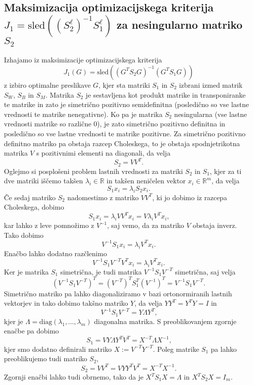 \documentclass[mat1]{article}
\theoremstyle{definition}
\begin{document}
\subsection{Maksimizacija optimizacijskega kriterija $J_1 = \text{sled} \left((S^\ell_2)^{-1} S^\ell_1 \right)$ za nesingularno matriko $S_2$}
Izhajamo iz maksimizacije optimizacijskega kriterija 
$$J_1(G) = \text{sled}\left((G^T S_2 G)^{-1} (G^T S_1 G)\right)$$
z izbiro optimalne preslikave $G$, kjer sta matriki $S_1$ in $S_2$ izbrani izmed matrik $S_W$, $S_B$ in $S_M$.
Matrika $S_2$ je sestavljena kot produkt matrike in transponiranke te matrike in zato je simetrično pozitivno semidefinitna (posledično so vse lastne vrednosti te matrike nenegativne). Ko pa je matrika $S_2$ nesingularna (vse lastne vrednosti matrike so različne $0$), je zato simetrično pozitivno definitna in posledično so vse lastne vrednosti te matrike pozitivne. Za simetrično pozitivno definitno matriko pa obstaja razcep Choleskega, to je obstaja spodnjetrikotna matrika $V$ s pozitivnimi elementi na diagonali, da velja
$$ S_2 = V V^T \text{.}
$$
Oglejmo si posplošeni problem lastnih vrednosti za matriki $S_2$ in $S_1$, kjer za ti dve matriki iščemo takšen $\lambda_i \in \mathbb{R}$ in takšen neničelen vektor $x_i \in \mathbb{R}^m$, da velja
\begin{equation} \label{pos-prob-last-v}
S_1 x_i = \lambda_i S_2 x_i
\text{.}
\end{equation}
Če sedaj matriko $S_2$ nadomestimo z matriko $VV^T$, ki jo dobimo iz razcepa Choleskega, dobimo
$$
S_1 x_i = \lambda_i V V^T x_i = V \lambda_i V^T x_i
\text{,}
$$
kar lahko z leve pomnožimo z $V^{-1}$, saj vemo, da za matriko $V$ obstaja inverz. Tako dobimo
$$
V^{-1} S_1 x_i = \lambda_i V^T x_i
\text{.}
$$
Enačbo lahko dodatno razčlenimo
$$
V^{-1} S_1 V^{-T} V^T x_i = \lambda_i V^T x_i
\text{.}
$$
Ker je matrika $S_1$ simetrična, je tudi matrika $V^{-1} S_1 V^{-T}$ simetrična, saj velja
$$
(V^{-1} S_1 V^{-T})^T =  (V^{-T})^T S_1^T (V^{-1})^T =  V^{-1} S_1 V^{-T}
\text{.}
$$
Simetrično matriko pa lahko diagonaliziramo v bazi ortonormiranih lastnih vektorjev in tako dobimo takšno matriko $Y$, da velja $Y Y^T = Y^T Y = I $ in 
$$
V^{-1} S_1 V^{-T} = Y \Lambda Y^T
\text{,}
$$
kjer je $\Lambda = \text{diag}\left(\lambda_1, \ldots, \lambda_m \right)$ diagonalna matrika. S preoblikovanjem zgornje enačbe pa dobimo
$$
S_1 = VY \Lambda Y^TV^T = X^{-T} \Lambda X^{-1}
\text{,}
$$
kjer smo dodatno definirali matriko $X := V^{-T} Y^{-T}$.
Poleg matrike $S_1$ pa lahko preoblikujemo tudi matriko $S_2$,
$$
S_2 = VV^T = VYY^TV^T = X^{-T}X^{-1}
\text{.}
$$
Zgornji enačbi lahko tudi obrnemo, tako da je $X^T S_1 X = \Lambda$ in $X^T S_2 X = I_m$.
\end{document}
